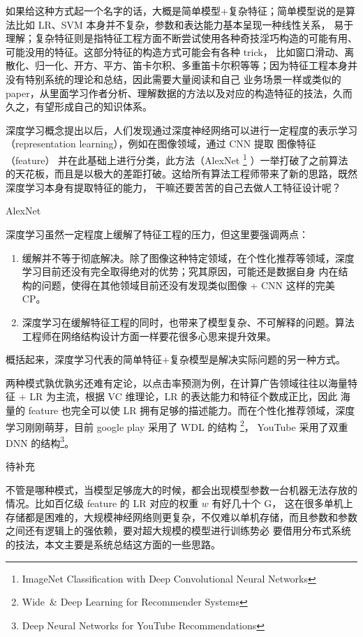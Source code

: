 如果给这种方式起一个名字的话，大概是简单模型+复杂特征；简单模型说的是算法比如 LR、SVM 本身并不复杂，参数和表达能力基本呈现一种线性关系，
易于理解；复杂特征则是指特征工程方面不断尝试使用各种奇技淫巧构造的可能有用、可能没用的特征。这部分特征的构造方式可能会有各种 trick，
比如窗口滑动、离散化、归一化、开方、平方、笛卡尔积、多重笛卡尔积等等；因为特征工程本身并没有特别系统的理论和总结，因此需要大量阅读和自己
业务场景一样或类似的 paper，从里面学习作者分析、理解数据的方法以及对应的构造特征的技法，久而久之，有望形成自己的知识体系。

深度学习概念提出以后，人们发现通过深度神经网络可以进行一定程度的表示学习（representation learning），例如在图像领域，通过 CNN 提取
图像特征（feature） 并在此基础上进行分类，此方法（AlexNet%
\footnote{ImageNet Classification with Deep Convolutional Neural Networks}%
）一举打破了之前算法的天花板，而且是以极大的差距打破。这给所有算法工程师带来了新的思路，既然深度学习本身有提取特征的能力，
干嘛还要苦苦的自己去做人工特征设计呢？

\begin{newnote}[AlexNet]
AlexNet
\end{newnote}

深度学习虽然一定程度上缓解了特征工程的压力，但这里要强调两点：
\begin{enumerate}
\item 缓解并不等于彻底解决。除了图像这种特定领域，在个性化推荐等领域，深度学习目前还没有完全取得绝对的优势；究其原因，可能还是数据自身
内在结构的问题，使得在其他领域目前还没有发现类似图像 + CNN 这样的完美 CP。
\item 深度学习在缓解特征工程的同时，也带来了模型复杂、不可解释的问题。算法工程师在网络结构设计方面一样要花很多心思来提升效果。
\end{enumerate}
概括起来，深度学习代表的简单特征+复杂模型是解决实际问题的另一种方式。

两种模式孰优孰劣还难有定论，以点击率预测为例，在计算广告领域往往以海量特征 + LR 为主流，根据 VC 维理论，LR 的表达能力和特征个数成正比，因此
海量的 feature 也完全可以使 LR 拥有足够的描述能力。而在个性化推荐领域，深度学习刚刚萌芽，目前 google play 采用了 WDL 的结构
\footnote{Wide~\& Deep Learning for Recommender Systems}，
YouTube 采用了双重 DNN 的结构\footnote{Deep Neural Networks for YouTube Recommendations}。

\begin{newnote}[VC 维理论]
待补充
\end{newnote}

不管是哪种模式，当模型足够庞大的时候，都会出现模型参数一台机器无法存放的情况。比如百亿级 feature 的 LR 对应的权重 $w$ 有好几十个 G，
这在很多单机上存储都是困难的，大规模神经网络则更复杂，不仅难以单机存储，而且参数和参数之间还有逻辑上的强依赖，要对超大规模的模型进行训练势必
要借用分布式系统的技法，本文主要是系统总结这方面的一些思路。

